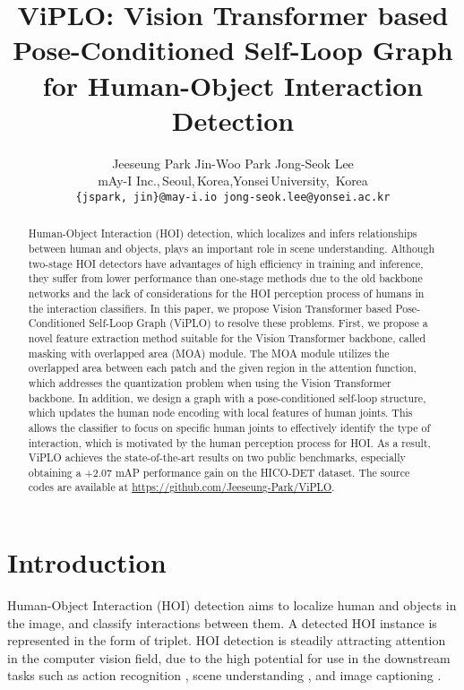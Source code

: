 \documentclass[10pt,twocolumn,letterpaper]{article}
\begin{document}
\title{ViPLO: Vision Transformer based Pose-Conditioned Self-Loop Graph for Human-Object Interaction Detection}

\author{
Jeeseung Park \qquad Jin-Woo Park \qquad Jong-Seok Lee \smallskip\\
{mAy-I Inc.,\,Seoul,\,Korea,\qquad Yonsei\,University, \,Korea} \\
{\tt\small \{jspark,\,jin\}@may-i.io \qquad jong-seok.lee@yonsei.ac.kr}
}



\maketitle

\begin{abstract}
   Human-Object Interaction (HOI) detection, which localizes and infers relationships between human and objects, plays an important role in scene understanding. Although two-stage HOI detectors have advantages of high efficiency in training and inference, they suffer from lower performance than one-stage methods due to the old backbone networks and the lack of considerations for the HOI perception process of humans in the interaction classifiers. In this paper, we propose Vision Transformer based Pose-Conditioned Self-Loop Graph (ViPLO) to resolve these problems. First, we propose a novel feature extraction method suitable for the Vision Transformer backbone, called masking with overlapped area (MOA) module. The MOA module utilizes the overlapped area between each patch and the given region in the attention function, which addresses the quantization problem when using the Vision Transformer backbone. In addition, we design a graph with a pose-conditioned self-loop structure, which updates the human node encoding with local features of human joints. This allows the classifier to focus on specific human joints to effectively identify the type of interaction, which is motivated by the human perception process for HOI. As a result, ViPLO achieves the state-of-the-art results on two public benchmarks, especially obtaining a +2.07 mAP performance gain on the HICO-DET dataset. The source codes are available at \url{https://github.com/Jeeseung-Park/ViPLO}.

\end{abstract}

\section{Introduction}
\label{sec:1}
Human-Object Interaction (HOI) detection aims to localize human and objects in the image, and classify interactions between them. A detected HOI instance is represented in the form of {\emph{}} triplet. HOI detection is steadily attracting attention in the computer vision field, due to the high potential for use in the downstream tasks such as action recognition \cite{yan2018spatial}, scene understanding \cite{xiao2018unified}, and image captioning \cite{you2016image}.
\end{document}
